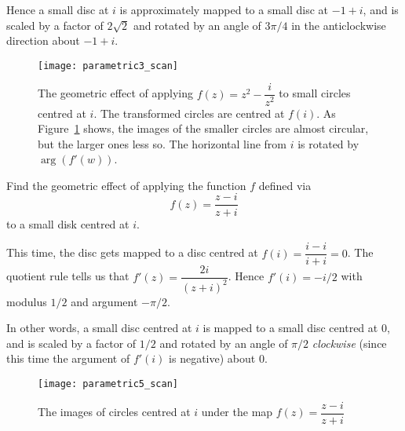Hence a small disc at $i$ is approximately mapped to a small disc at $-1+i$, and is scaled by a factor of $2\sqrt{2}$ and rotated by an angle of $3\pi/4$  in the anticlockwise direction about $-1+i$.






\begin{figure}[h]
\centering
\texttt{[image: parametric3\_scan]}
\caption{The geometric effect of applying $f(z)=z^2-\dfrac{i}{z^2}$ to small circles centred at $i$. The transformed circles are centred at $f(i)$.  As Figure~\ref{f:circles} shows, the images of the smaller circles are almost circular, but the larger ones less so.  The horizontal line from $i$ is rotated by $\arg(f'(w))$.}
\label{f:circles}
\end{figure}


\begin{example}
Find the geometric effect of applying the function $f$ defined via
\[
f(z)=\frac{z-i}{z+i}
\]
to a small disk centred at $i$.

\end{example}
This time, the disc gets mapped to a disc centred at $f(i) = \dfrac{i-i}{i+i} = 0$.  The quotient rule tells us that $f'(z) = \dfrac{2i}{(z+i)^2}$.  Hence $f'(i)=-i/2$ with modulus $1/2$ and argument $-\pi/2$.

In other words, a small disc centred at $i$ is mapped to a small disc centred at $0$, and is scaled by a factor of $1/2$ and rotated by an angle of $\pi/2$ \emph{clockwise} (since this time the argument of $f'(i)$ is negative) about $0$.

\begin{figure}[h]
\centering
\texttt{[image: parametric5\_scan]}
\caption{The images of circles centred at $i$ under the map $f(z)=\dfrac{z-i}{z+i}$}
\end{figure}
